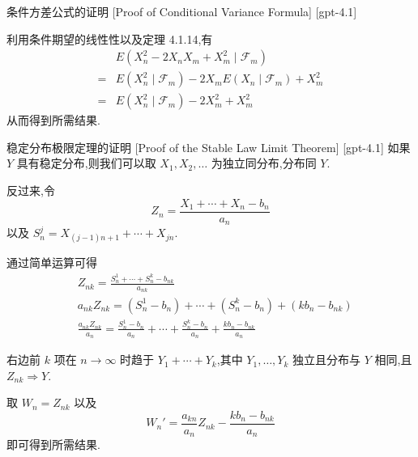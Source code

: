 \documentclass[UTF8]{ctexart}
\begin{document}
    
    
    \begin{prf}
        {条件方差公式的证明}
        [Proof of Conditional Variance Formula]
        [gpt-4.1]
        
利用条件期望的线性性以及定理 4.1.14,有
\[
\begin{aligned}
& E \left( X_n^2 - 2 X_n X_m + X_m^2 \mid \mathcal{F}_m \right) \\
= & E \left( X_n^2 \mid \mathcal{F}_m \right) - 2 X_m E \left( X_n \mid \mathcal{F}_m \right) + X_m^2 \\
= & E \left( X_n^2 \mid \mathcal{F}_m \right) - 2 X_m^2 + X_m^2
\end{aligned}
\]
从而得到所需结果.

    \end{prf}
    
    
    
    \begin{prf}
        {稳定分布极限定理的证明}
        [Proof of the Stable Law Limit Theorem]
        [gpt-4.1]
        如果 $Y$ 具有稳定分布,则我们可以取 $X_1, X_2, \dots$ 为独立同分布,分布同 $Y$.

反过来,令
\[
Z_n = \frac{X_1 + \cdots + X_n - b_n}{a_n}
\]
以及 $S_n^j = X_{(j-1)n+1} + \cdots + X_{jn}$.

通过简单运算可得
\[
\begin{array}{rl}
& Z_{nk} = \frac{S_n^1 + \cdots + S_n^k - b_{nk}}{a_{nk}} \\
& a_{nk} Z_{nk} = (S_n^1 - b_n) + \cdots + (S_n^k - b_n) + (k b_n - b_{nk}) \\
& \frac{a_{nk} Z_{nk}}{a_n} = \frac{S_n^1 - b_n}{a_n} + \cdots + \frac{S_n^k - b_n}{a_n} + \frac{k b_n - b_{nk}}{a_n}
\end{array}
\]

右边前 $k$ 项在 $n \to \infty$ 时趋于 $Y_1 + \cdots + Y_k$,其中 $Y_1, \dots, Y_k$ 独立且分布与 $Y$ 相同,且 $Z_{nk} \Rightarrow Y$.

取 $W_n = Z_{nk}$ 以及
\[
W_n' = \frac{a_{kn}}{a_n} Z_{nk} - \frac{k b_n - b_{nk}}{a_n}
\]
即可得到所需结果.

    \end{prf}
    
    
    
\end{document}
